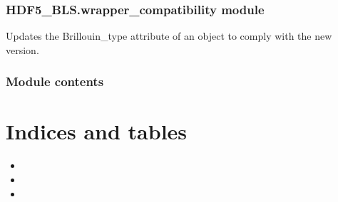\documentclass[letterpaper,10pt,english]{sphinxmanual}
\begin{document}
\subsection{HDF5\_BLS.wrapper\_compatibility module}
\label{\detokenize{source/HDF5_BLS:module-HDF5_BLS.wrapper_compatibility}}\label{\detokenize{source/HDF5_BLS:hdf5-bls-wrapper-compatibility-module}}

\begin{fulllineitems}
\label{\detokenize{source/HDF5_BLS:HDF5_BLS.wrapper_compatibility.brillouin_type_update}}
\pysigstartsignatures
\pysiglinewithargsret
{}
{\sphinxparamcomma {}}
{}
\pysigstopsignatures
\sphinxAtStartPar
Updates the Brillouin\_type attribute of an object to comply with the new version.

\end{fulllineitems}



\subsection{Module contents}
\label{\detokenize{source/HDF5_BLS:module-HDF5_BLS}}\label{\detokenize{source/HDF5_BLS:module-contents}}

\chapter{Indices and tables}
\label{\detokenize{index:indices-and-tables}}\begin{itemize}
\item {} 
\sphinxAtStartPar
{}

\item {} 
\sphinxAtStartPar
{}

\item {} 
\sphinxAtStartPar
{}

\end{itemize}
\end{document}
